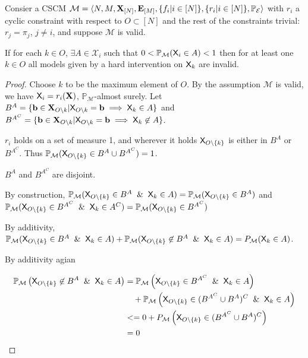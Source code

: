 \begin{theorem}\label{th:recursive_no_interventions}
Consier a CSCM $\mathcal{M}=\langle N,M,\mathbf{X}_{[N]},\mathbf{E}_{[M]},\{f_i|i\in[N]\},\{r_i|i\in [N]\},\mathbb{P}_{\mathcal{E}}\rangle$ with $r_i$ a cyclic constraint with respect to $O\subset[N]$ and the rest of the constraints trivial: $r_j = \pi_j$, $j\neq i$, and suppose $\mathcal{M}$ is valid.

If for each $k\in O$, $\exists A\in \mathcal{X}_i$ such that $0<\mathbb{P}_{\mathcal{M}}(\mathsf{X}_i\in A)<1$ then for at least one $k\in O$ all models given by a hard intervention on $\mathsf{X}_k$ are invalid.
\end{theorem}

\begin{proof}
Choose $k$ to be the maximum element of $O$. By the assumption $\mathcal{M}$ is valid, we have $\mathsf{X}_i=r_i(\mathbf{X})$, $\mathbb{P}_{\mathcal{M}}$-almost surely. Let $B^A=\{\mathbf{b}\in \mathbf{X}_{O\setminus k}|\mathsf{X}_{O\setminus k}=\mathbf{b}\implies \mathsf{X}_k \in A\}$ and $B^{A^C}=\{\mathbf{b}\in \mathbf{X}_{O\setminus k}|\mathsf{X}_{O\setminus k}=\mathbf{b}\implies \mathsf{X}_k \not\in A\}$. 

$r_i$ holds on a set of measure 1, and wherever it holds $\mathsf{X}_{O\setminus\{k\}}$ is either in $B^A$ or $B^{A^C}$. Thus $\mathbb{P}_{\mathcal{M}}(\mathsf{X}_{O\setminus\{k\}}\in B^A\cup B^{A^C})=1$. 

$B^A$ and $B^{A^C}$ are disjoint.

By construction, $\mathbb{P}_{\mathcal{M}}(\RV{X}_{O\setminus\{k\}}\in B^A \And \RV{X}_k\in A) = \mathbb{P}_{\mathcal{M}}(\RV{X}_{O\setminus\{k\}}\in B^A)$ and $\mathbb{P}_{\mathcal{M}}(\RV{X}_{O\setminus\{k\}}\in B^{A^C} \And \RV{X}_k\in A^C) = \mathbb{P}_{\mathcal{M}}(\RV{X}_{O\setminus\{k\}}\in B^{A^C})$

By additivity, $\mathbb{P}_{\mathcal{M}}(\RV{X}_{O\setminus\{k\}}\in B^A \And \RV{X}_k\in A) + \mathbb{P}_{\mathcal{M}} (\RV{X}_{O\setminus\{k\}}\not\in B^A \And \RV{X}_k\in A)=P_{\mathcal{M}} (\RV{X}_k\in A)$. 

By additivity agian

\begin{align}
	\mathbb{P}_{\mathcal{M}} \left(\RV{X}_{O\setminus\{k\}}\not\in B^A \And \RV{X}_k\in A\right) &=\mathbb{P}_{\mathcal{M}} \left(\RV{X}_{O\setminus\{k\}}\in B^{A^C} \And \RV{X}_k\in A\right) \\
	&\quad+  \mathbb{P}_{\mathcal{M}} \left(\RV{X}_{O\setminus\{k\}}\in (B^{A^C}\cup B^A)^C \And \RV{X}_k\in A\right)\\
	&<= 0 + P_{\mathcal{M}} \left(\RV{X}_{O\setminus\{k\}}\in (B^{A^C}\cup B^A)^C\right)\\
	&= 0
\end{align}


\end{proof}

